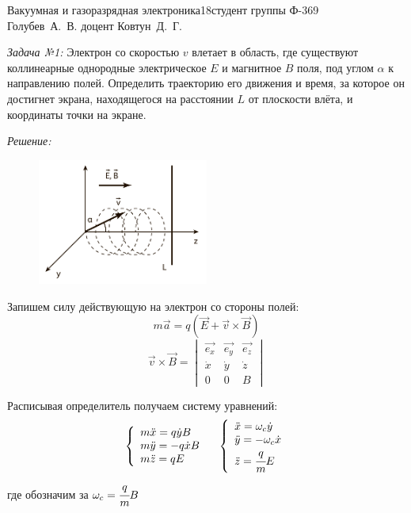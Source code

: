 




\usepackage{wrapfig}


{Вакуумная и газоразрядная электроника}{}{18}{студент группы Ф-369\\Голубев~А.~В.}
{}{доцент Ковтун~Д.~Г.}{}{}

\emph{Задача №1:} Электрон со скоростью \( v \) влетает в область, где 
существуют коллинеарные однородные электрическое \( E \) и магнитное \( B \) 
поля, под углом \( \alpha \) к направлению полей. Определить траекторию 
его движения и время, за которое он достигнет экрана, находящегося на 
расстоянии \( L \) от плоскости влёта, и координаты точки на экране.

\emph{Решение:}

\begin{figure}
    \vspace{-2ex}
    \includegraphics[width=0.5\textwidth]{images/im_01}
\end{figure}

Запишем силу действующую на электрон со стороны полей:
\[
	m\vec{a} = q\left( \vec{E} + \vec{v}\times\vec{B} \right)
\]
\[
	\vec{v}\times\vec{B} = 
	\begin{vmatrix}
		\vec{e_x} & \vec{e_y} & \vec{e_z} \\
		\dot{x}   & \dot{y}   & \dot{z}   \\
		0         & 0         & B
	\end{vmatrix}
\]

Расписывая определитель получаем систему уравнений:
\[
	\left\{ \begin{array}{ll}
		m\ddot{x} = q\dot{y}B \\
		m\ddot{y} = -q\dot{x}B \\
		m\ddot{z} = qE
	\end{array} \right.
	\quad
	\left\{ \begin{array}{ll}
		\ddot{x} = \omega_c\dot{y} \\
		\ddot{y} = -\omega_c\dot{x} \\
		\ddot{z} = \cfrac{q}{m}E
	\end{array} \right.
\]
где обозначим за \( \omega_c = \cfrac{q}{m}B \)

